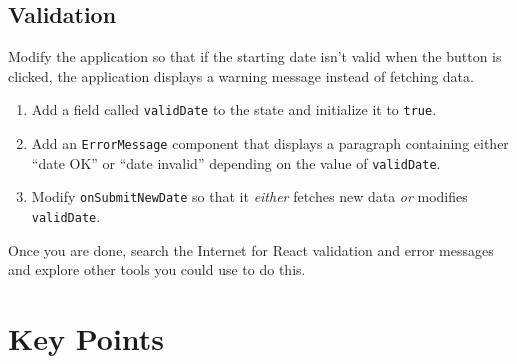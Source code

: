 \subsection*{Validation}
Modify the application so that if the starting date isn't valid when the button is clicked,
the application displays a warning message instead of fetching data.

\begin{enumerate}
\item
  Add a field called \texttt{validDate} to the state and initialize it to \texttt{true}.
\item
  Add an \texttt{ErrorMessage} component that displays a paragraph containing either ``date OK'' or ``date invalid''
  depending on the value of \texttt{validDate}.
\item
  Modify \texttt{onSubmitNewDate} so that it \emph{either} fetches new data \emph{or} modifies \texttt{validDate}.
\end{enumerate}

Once you are done,
search the Internet for React validation and error messages
and explore other tools you could use to do this.

\section*{Key Points}


